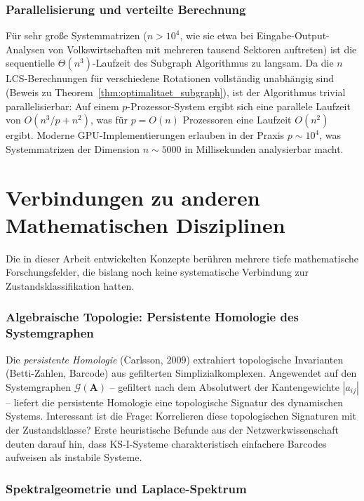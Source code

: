 ﻿\documentclass[12pt, a4paper, titlepage]{report}
\theoremstyle{definition}
\theoremstyle{remark}
\newcommand{\vA}{\bm{A}}
\begin{document}
\subsubsection*{Parallelisierung und verteilte Berechnung}

Für sehr große Systemmatrizen ($n > 10^4$, wie sie etwa bei Eingabe-Output-Analysen
von Volkswirtschaften mit mehreren tausend Sektoren auftreten) ist die sequentielle
$\Theta(n^3)$-Laufzeit des Subgraph Algorithmus zu langsam. Da die $n$ LCS-Berechnungen
für verschiedene Rotationen vollständig unabhängig sind (Beweis zu
Theorem~\ref{thm:optimalitaet_subgraph}), ist der Algorithmus trivial parallelisierbar:
Auf einem $p$-Prozessor-System ergibt sich eine parallele Laufzeit von
$O(n^3/p + n^2)$, was für $p = O(n)$ Prozessoren eine Laufzeit $O(n^2)$ ergibt.
Moderne GPU-Implementierungen erlauben in der Praxis $p \sim 10^4$, was
Systemmatrizen der Dimension $n \sim 5000$ in Millisekunden analysierbar macht.

\section{Verbindungen zu anderen Mathematischen Disziplinen}
\label{subsec:math_verbindungen}

Die in dieser Arbeit entwickelten Konzepte berühren mehrere tiefe mathematische
Forschungsfelder, die bislang noch keine systematische Verbindung zur Zustandsklassifikation
hatten.

\subsubsection*{Algebraische Topologie: Persistente Homologie des Systemgraphen}

Die \emph{persistente Homologie} (Carlsson, 2009) extrahiert topologische
Invarianten (Betti-Zahlen, Barcode) aus gefilterten Simplizialkomplexen. Angewendet
auf den Systemgraphen $\mathcal{G}(\vA)$ -- gefiltert nach dem Absolutwert der
Kantengewichte $|a_{ij}|$ -- liefert die persistente Homologie eine
topologische Signatur des dynamischen Systems. Interessant ist die Frage: Korrelieren
diese topologischen Signaturen mit der Zustandsklasse? Erste heuristische Befunde
aus der Netzwerkwissenschaft deuten darauf hin, dass KS-I-Systeme charakteristisch
einfachere Barcodes aufweisen als instabile Systeme.

\subsubsection*{Spektralgeometrie und Laplace-Spektrum}
\end{document}
